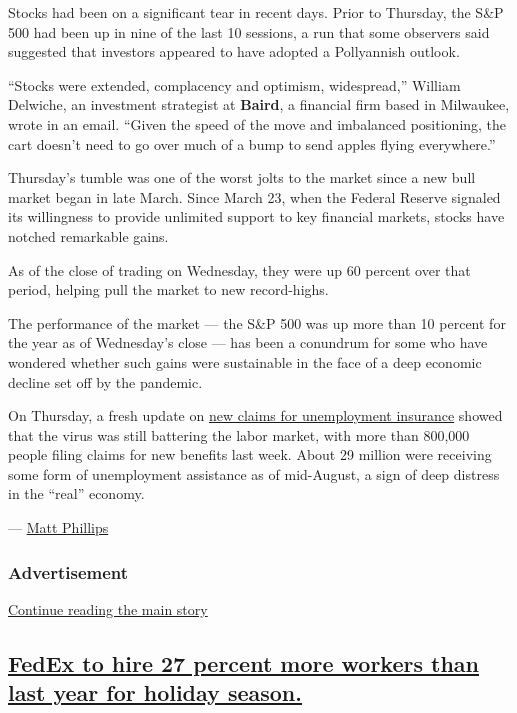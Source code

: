 Stocks had been on a significant tear in recent days. Prior to Thursday,
the S\&P 500 had been up in nine of the last 10 sessions, a run that
some observers said suggested that investors appeared to have adopted a
Pollyannish outlook.

``Stocks were extended, complacency and optimism, widespread,'' William
Delwiche, an investment strategist at \textbf{Baird}, a financial firm
based in Milwaukee, wrote in an email. ``Given the speed of the move and
imbalanced positioning, the cart doesn't need to go over much of a bump
to send apples flying everywhere.''

Thursday's tumble was one of the worst jolts to the market since a new
bull market began in late March. Since March 23, when the Federal
Reserve signaled its willingness to provide unlimited support to key
financial markets, stocks have notched remarkable gains.

As of the close of trading on Wednesday, they were up 60 percent over
that period, helping pull the market to new record-highs.

The performance of the market --- the S\&P 500 was up more than 10
percent for the year as of Wednesday's close --- has been a conundrum
for some who have wondered whether such gains were sustainable in the
face of a deep economic decline set off by the pandemic.

On Thursday, a fresh update on
\href{https://www.nytimes3xbfgragh.onion/live/2020/09/03/business/stock-market-today-coronavirus/new-state-unemployment-claims-remained-high-in-the-latest-weekly-tally}{new
claims for unemployment insurance} showed that the virus was still
battering the labor market, with more than 800,000 people filing claims
for new benefits last week. About 29 million were receiving some form of
unemployment assistance as of mid-August, a sign of deep distress in the
``real'' economy.

--- \href{https://www.nytimes3xbfgragh.onion/by/matt-phillips}{Matt
Phillips}

\hypertarget{advertisement}{%
\subsubsection{Advertisement}\label{advertisement}}

\protect\hyperlink{after-dfp-ad-mid1}{Continue reading the main story}

\hypertarget{fedex-to-hire-27-percent-more-workers-than-last-year-for-holiday-season}{%
\subsection{\texorpdfstring{\protect\hyperlink{fedex-to-hire-27-percent-more-workers-than-last-year-for-holiday-season}{FedEx
to hire 27 percent more workers than last year for holiday
season.}}{FedEx to hire 27 percent more workers than last year for holiday season.}}\label{fedex-to-hire-27-percent-more-workers-than-last-year-for-holiday-season}}

